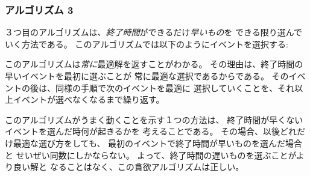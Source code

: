 \subsubsection*{アルゴリズム 3}

３つ目のアルゴリズムは、\emph{終了時間}ができるだけ\emph{早いもの}を
できる限り選んでいく方法である。
このアルゴリズムでは以下のようにイベントを選択する:
\begin{center}
\end{center}

\begin{comment}
It turns out that this algorithm
\emph{always} produces an optimal solution.
The reason for this is that it is always an optimal choice
to first select an event that ends
as early as possible.
After this, it is an optimal choice
to select the next event
using the same strategy, etc.,
until we cannot select any more events.

One way to argue that the algorithm works
is to consider
what happens if we first select an event
that ends later than the event that ends
as early as possible.
Now, we will have at most an equal number of
choices how we can select the next event.
Hence, selecting an event that ends later
can never yield a better solution,
and the greedy algorithm is correct.
\end{comment}

このアルゴリズムは\emph{常に}最適解を返すことがわかる。
その理由は、終了時間の早いイベントを最初に選ぶことが
常に最適な選択であるからである。
そのイベントの後は、同様の手順で次のイベントを最適に
選択していくことを、それ以上イベントが選べなくなるまで繰り返す。

このアルゴリズムがうまく動くことを示す１つの方法は、
終了時間が早くないイベントを選んだ時何が起きるかを
考えることである。
その場合、以後どれだけ最適な選び方をしても、
最初のイベントで終了時間が早いものを選んだ場合と
せいぜい同数にしかならない。
よって、終了時間の遅いものを選ぶことがより良い解と
なることはなく、この貪欲アルゴリズムは正しい。


